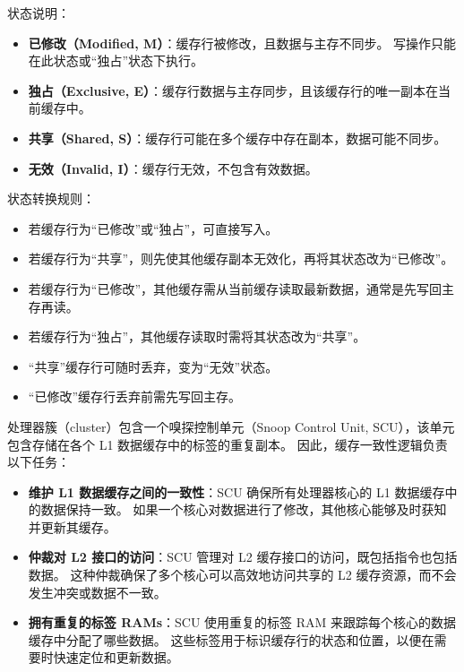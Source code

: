 
状态说明：

\begin{itemize}
\item
  \textbf{已修改（Modified, M）}：缓存行被修改，且数据与主存不同步。
  写操作只能在此状态或“独占”状态下执行。
\item
  \textbf{独占（Exclusive, E）}：缓存行数据与主存同步，且该缓存行的唯一副本在当前缓存中。
\item
  \textbf{共享（Shared, S）}：缓存行可能在多个缓存中存在副本，数据可能不同步。
\item
  \textbf{无效（Invalid, I）}：缓存行无效，不包含有效数据。
\end{itemize}

状态转换规则：

\begin{description}
\item [{写操作}] \hfill
  \begin{itemize}
  \item
    若缓存行为“已修改”或“独占”，可直接写入。
  \item
    若缓存行为“共享”，则先使其他缓存副本无效化，再将其状态改为“已修改”。
  \end{itemize}
\item
  [{读操作}] \hfill
  \begin{itemize}
  \item
    若缓存行为“已修改”，其他缓存需从当前缓存读取最新数据，通常是先写回主存再读。
  \item
    若缓存行为“独占”，其他缓存读取时需将其状态改为“共享”。
  \end{itemize}
\item
\item [{丢弃操作}] \hfill
  \begin{itemize}
  \item
    “共享”缓存行可随时丢弃，变为“无效”状态。
  \item
    “已修改”缓存行丢弃前需先写回主存。
  \end{itemize}
\end{description}

处理器簇（cluster）包含一个嗅探控制单元（Snoop Control Unit,
SCU），该单元包含存储在各个 L1 数据缓存中的标签的重复副本。
因此，缓存一致性逻辑负责以下任务：

\begin{itemize}
\item
  \textbf{维护 L1 数据缓存之间的一致性}：SCU 确保所有处理器核心的 L1 数据缓存中的数据保持一致。
  如果一个核心对数据进行了修改，其他核心能够及时获知并更新其缓存。
\item
  \textbf{仲裁对 L2 接口的访问}：SCU 管理对 L2 缓存接口的访问，既包括指令也包括数据。
  这种仲裁确保了多个核心可以高效地访问共享的 L2 缓存资源，而不会发生冲突或数据不一致。
\item
  \textbf{拥有重复的标签 RAMs}：SCU 使用重复的标签 RAM 来跟踪每个核心的数据缓存中分配了哪些数据。
  这些标签用于标识缓存行的状态和位置，以便在需要时快速定位和更新数据。
\end{itemize}

